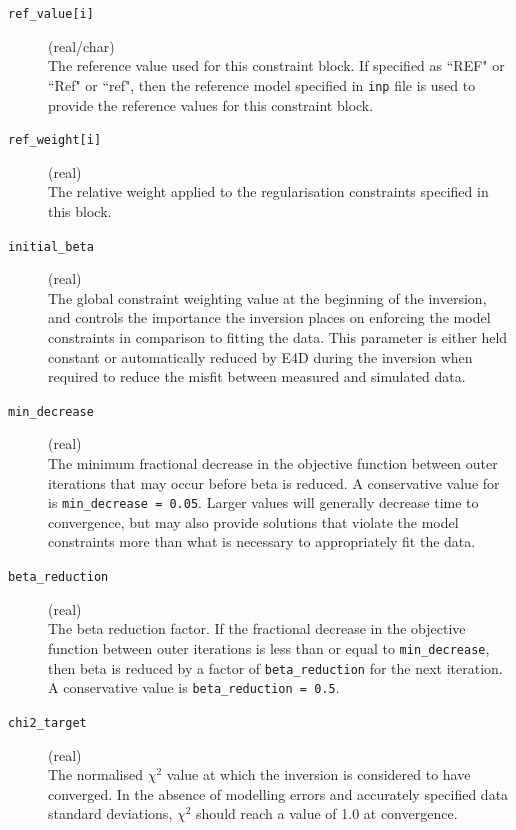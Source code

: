 \documentclass[a4paper,12pt]{article}
\begin{document}
\begin{description}
    \item[\texttt{ref\_value[i]}] (real/char)\hfill \\
     The reference value used for this constraint block. If specified as ``REF" or ``Ref" or ``ref", then the reference model specified in \texttt{inp} file is used to provide the reference values for this constraint block.

     \item[\texttt{ref\_weight[i]}] (real)\hfill \\
     The relative weight applied to the regularisation constraints specified in this block.

     \item[\texttt{initial\_beta}] (real)\hfill \\
     The global constraint weighting value at the beginning of the inversion, and controls the importance the inversion places on enforcing the model constraints in comparison to fitting the data. This parameter is either held constant or automatically reduced by E4D during the inversion when required to reduce the misfit between measured and simulated data.

    \item[\texttt{min\_decrease}] (real)\hfill \\
     The minimum fractional decrease in the objective function between outer iterations that may occur before beta is reduced. A conservative value for is \texttt{min\_decrease = 0.05}. Larger values will generally decrease time to convergence, but may also provide solutions that violate the model constraints more than what is necessary to appropriately fit the data.

     \item[\texttt{beta\_reduction}] (real)\hfill \\
     The beta reduction factor. If the fractional decrease in the objective function between outer iterations is less than or equal to \texttt{min\_decrease}, then beta is reduced by a factor of \texttt{beta\_reduction} for the next iteration. A conservative value is \texttt{beta\_reduction = 0.5}.

     \item[\texttt{chi2\_target}] (real)\hfill \\
     The normalised $\chi^2$ value at which the inversion is considered to have converged. In the absence of modelling errors and accurately specified data standard deviations, $\chi^2$ should reach a value of 1.0 at convergence.


\end{description}
\end{document}
